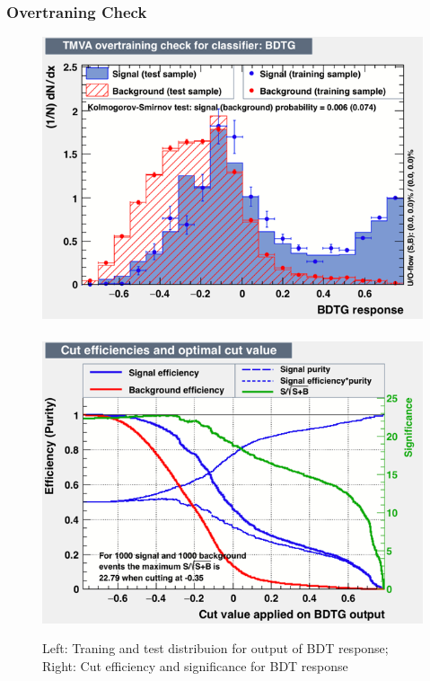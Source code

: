 \clearpage
\subsubsection{Overtraning Check}
\begin{figure}[h!]
	\includegraphics[scale=0.40]{Plots/BDT_Performance/Trial2/dataset/plots/overtrain_BDTG.png}%
	~
	\includegraphics[scale=0.40]{Plots/BDT_Performance/Trial2/dataset/plots/mvaeffs_BDTG.png}
	\caption{Left: Traning and test distribuion for output of BDT response; Right: Cut efficiency and significance for BDT response}
\end{figure}

